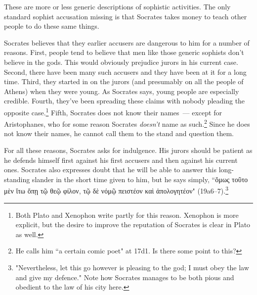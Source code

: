 \documentclass[11pt]{article}
\begin{document}
These are more or less generic descriptions of sophistic activities.  The
only standard sophist accusation missing is that Socrates takes money to
teach other people to do these same things.

Socrates believes that they earlier accusers are dangerous to him for
a number of reasons.  First, people tend to believe that men like those
generic sophists don't believe in the gods.  This would obviously prejudice
jurors in his current case.  Second, there have been many such accusers and
they have been at it for a long time.  Third, they started in on the jurors
(and presumably on all the people of Athens) when they were young.  As
Socrates says, young people are especially credible.  Fourth, they've been
spreading these claims with nobody pleading the opposite case.\footnote{Both
Plato and Xenophon write partly for this reason.  Xenophon is more explicit,
but the desire to improve the reputation of Socrates is clear in Plato as
well.}  Fifth, Socrates does not know their names~--- except for
Aristophanes, who for some reason Socrates \emph{doesn't} name as
such.\footnote{He calls him ``a certain comic poet" at 17d1.  Is there some
point to this?}  Since he does not know their names, he cannot call them to
the stand and question them.

For all these reasons, Socrates asks for indulgence.  His jurors should be
patient as he defends himself first against his first accusers and then
against his current ones.  Socrates also expresses doubt that he will be
able to answer this long-standing slander in the short time given to him,
but he says simply, ``ὅμως τοῦτο μὲν ἴτω ὅπῃ τῷ θεῷ φίλον, τῷ δὲ νόμῷ
πειστέον καὶ ἀπολογητέον" (19a6--7).\footnote{"Nevertheless, let this go
however is pleasing to the god; I must obey the law and give my defence."
Note how Socrates manages to be both pious and obedient to the law of his
city here.}




\newpage


\end{document}
